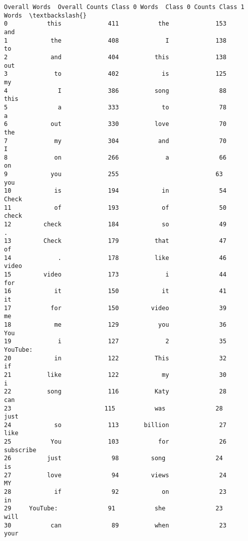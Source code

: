 \documentclass[11pt]{article}
\begin{document}
    \begin{Verbatim}[commandchars=\\\{\}]
   Overall Words  Overall Counts Class 0 Words  Class 0 Counts Class 1 Words  \textbackslash{}
0           this             411           the             153           and
1            the             408             I             138            to
2            and             404          this             138           out
3             to             402            is             125            my
4              I             386          song              88          this
5              a             333            to              78             a
6            out             330          love              70           the
7             my             304           and              70             I
8             on             266             a              66            on
9            you             255             ﻿              63           you
10            is             194            in              54         Check
11            of             193            of              50         check
12         check             184            so              49             .
13         Check             179          that              47            of
14             .             178          like              46         video
15         video             173             i              44           for
16            it             150            it              41            it
17           for             150         video              39            me
18            me             129           you              36           You
19             i             127             2              35     YouTube:﻿
20            in             122          This              32            if
21          like             122            my              30             i
22          song             116          Katy              28           can
23             ﻿             115           was              28          just
24            so             113       billion              27          like
25           You             103           for              26     subscribe
26          just              98         song﻿              24            is
27          love              94         views              24            MY
28            if              92            on              23            in
29     YouTube:﻿              91           she              23          will
30           can              89          when              23          your

\end{Verbatim}
\end{document}
